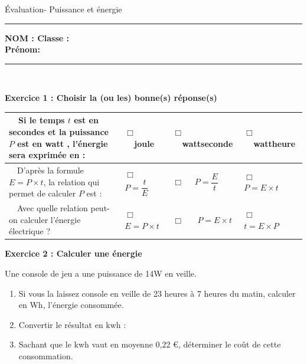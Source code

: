 \documentclass[11pt,a4paper]{article}
\newcommand{\cadreblanc}[1]{%
\medskip\framebox[\linewidth][c]{%
\rule{0mm}{#1mm}}\par
\medskip}
\begin{document}
\begin{center}
\LARGE{Évaluation- Puissance et énergie}\\[5mm]
\end{center}
\normalsize
\hrule 


\flushleft \textbf{NOM : \hfill Classe : \hspace{3cm} ~~\\[2mm]
Prénom:\\[0,4cm]
}
\hrule\
\\[0,2cm]

\vspace {8 mm}


\textbf{Exercice 1 : Choisir la (ou les) bonne(s) réponse(s)}


    \begin{tabular}{p{6cm}|C{3cm}|C{3cm}|C{3cm}}
         
        ~~Si le temps $t$ est en secondes et la puissance $P$ est en watt , l'énergie sera exprimée en :& $\Box $ ~~joule & $\Box $ ~~wattseconde   & $\Box $ ~~wattheure \\
         \hline
       ~~D'après la formule $E=P \times t$, la relation qui permet de calculer $P$ est : & $\Box $ ~~$P=\dfrac{t}{E}$ & $\Box $ ~~$P=\dfrac{E}{t}$   & $\Box $ ~~ $P=E \times t$ \\
        \hline
         ~~Avec quelle relation peut-on calculer l'énergie électrique ?  &$\Box $ ~~ $E= P \times t$  &$\Box $ ~~ $P=E \times t$  & $\Box $ ~~$t=E \times P$  \\
        
         \end{tabular}

\textbf{Exercice 2 : Calculer une énergie}

Une console de jeu a une puissance de 14W en veille. 
\begin{enumerate}
    \item Si vous la laissez console en veille de 23 heures à 7 heures du matin, calculer en Wh, l'énergie consommée. 
    
    \cadreblanc{15}
    \item Convertir le résultat en kwh : \dotfill 
    \item Sachant que le kwh vaut en moyenne 0,22 \euro, déterminer le coût de cette consommation. 
    
    \vspace{4mm}
    \dotfill 
    
\end{enumerate}
\end{document}
